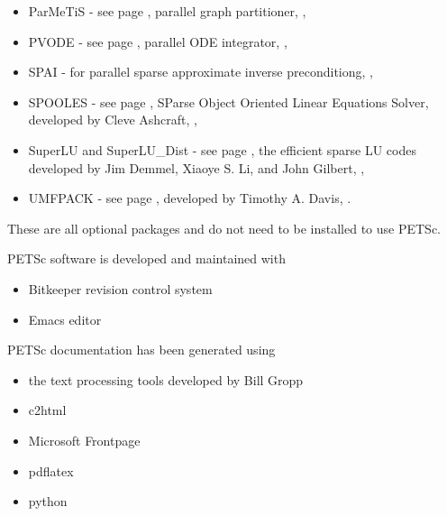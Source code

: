 \begin{itemize}
  \item ParMeTiS -     see page \pageref{sec_partitioning}, parallel graph partitioner,
                     ,
  \item PVODE -       see page \pageref{sec_pvode}, parallel ODE integrator,
                     ,
  \item SPAI -        for parallel sparse approximate inverse preconditiong, 
                     ,
  \item SPOOLES - see page \pageref{sec_externalsol}, SParse Object Oriented Linear Equations Solver, developed by Cleve Ashcraft, 
                    ,
  \item SuperLU and SuperLU\_Dist - see page \pageref{sec_externalsol}, 
                    the efficient sparse LU codes developed by Jim Demmel,  Xiaoye S. Li, and John Gilbert, 
                    ,
  \item UMFPACK - see page \pageref{sec_externalsol}, 
                    developed by Timothy A. Davis, 
                    .
\end{itemize}
These are all optional packages and do not need to be installed to use PETSc.

PETSc software is developed and maintained with 
\begin{itemize}
\item Bitkeeper revision control system
\item Emacs editor
\end{itemize}

PETSc documentation has been generated using
\begin{itemize}
\item the text processing tools developed by Bill Gropp
\item c2html
\item Microsoft Frontpage
\item pdflatex
\item python
\end{itemize}

